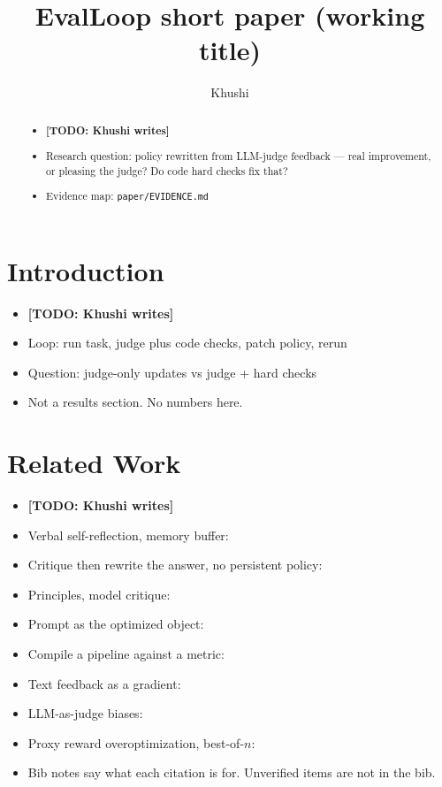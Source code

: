 \documentclass{article}
\title{EvalLoop short paper (working title)}
\author{Khushi}
\newcommand{\todo}[1]{\textbf{[TODO: #1]}}
\begin{document}
\maketitle

\begin{abstract}
\begin{itemize}
  \item \todo{Khushi writes}
  \item Research question: policy rewritten from LLM-judge feedback --- real improvement, or pleasing the judge? Do code hard checks fix that?
  \item Evidence map: \texttt{paper/EVIDENCE.md}
\end{itemize}
\end{abstract}

\section{Introduction}
\begin{itemize}
  \item \todo{Khushi writes}
  \item Loop: run task, judge plus code checks, patch policy, rerun
  \item Question: judge-only updates vs judge + hard checks
  \item Not a results section. No numbers here.
\end{itemize}

\section{Related Work}
\begin{itemize}
  \item \todo{Khushi writes}
  \item Verbal self-reflection, memory buffer: \citep{shinn2023reflexion}
  \item Critique then rewrite the answer, no persistent policy: \citep{madaan2023selfrefine}
  \item Principles, model critique: \citep{bai2022constitutional}
  \item Prompt as the optimized object: \citep{yang2023opro}
  \item Compile a pipeline against a metric: \citep{khattab2023dspy}
  \item Text feedback as a gradient: \citep{yuksekgonul2024textgrad}
  \item LLM-as-judge biases: \citep{zheng2023judging}
  \item Proxy reward overoptimization, best-of-$n$: \citep{gao2022scaling}
  \item Bib notes say what each citation is for. Unverified items are not in the bib.
\end{itemize}
\end{document}
